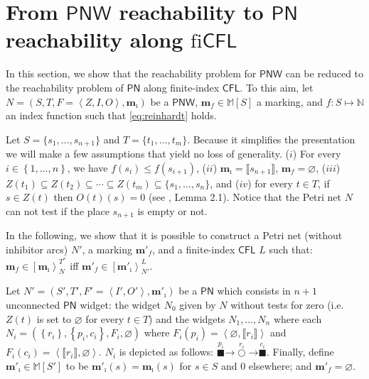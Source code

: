 \documentclass{fsttcs}
\def\set#1{{\left\{ #1 \right\}}}
\def\tuple#1{{\left\langle #1 \right\rangle}}
\def\multi#1{{\llbracket #1 \rrbracket}}
\def\nats{{\mathbb{N}}}
\newcommand{\multiset}[1]{{\mathbb{M}[ #1 ]}}
\def\mmap{\mathbf{m}}
\newcommand{\fire}[1]{\left[ {#1}\right\rangle}
\def\cfl{\mathsf{CFL}}
\def\pn{\mathsf{PN}}
\def\pnw{\mathsf{PNW}}
\begin{document}
 \section{From $\pnw$ reachability to  $\pn$ reachability along \(\text{fi}\cfl\)}\label{sec:reduc_faouzi}

In this section, we show that the reachability problem for \(\pnw\) can be
reduced to the reachability problem of \(\pn\) along finite-index \(\cfl\). To
this aim, let $N=(S,T,F=\tuple{Z,I,O},\mmap_{\imath})$ be a $\pnw$, $\mmap_f
\in \multiset{S}$ a marking,  and \(f\colon S\mapsto\nats\) an
index function such that \eqref{eq:reinhardt} holds.



Let $S=\{s_1,\ldots,s_{n+1}\}$   and $T=\{t_1,\ldots, t_m\}$.  Because it
simplifies the presentation we will make a few assumptions that yield no loss
of generality.  (\(i\)) For every $i \in \set{1,\ldots,n}$, we have $f(s_i) \leq
f(s_{i+1})$, (\(ii\)) $\mmap_{\imath}=\multi{s_{n+1}}$,   $\mmap_{f}=\varnothing$,
(\(iii\)) $Z(t_1) \subseteq Z(t_2) \subseteq \cdots \subseteq Z(t_m) \subseteq
\{s_1,\ldots,s_n\}$, and (\(iv\)) for every $t \in T$, if $s \in Z(t)$ then
$O(t)(s)=0$ (see \cite{Reinhardt}, Lemma 2.1).  Notice that the Petri net $N$
can not test if the place $s_{n+1}$ is empty or not.



In the following, we show that it is possible to construct a Petri net (without
inhibitor arcs)  $N'$, a marking
\(\mmap'_{f}\), and a finite-index \(\cfl\) $L$ such that:
\(\mmap_{f}\in\fire{\mmap_{\imath}}_{N}^{T^*}\)
if{}f
\(\mmap'_{f}\in\fire{\mmap'_{\imath}}_{N'}^{L}\).


\smallskip {} 
Let \(N'=(S',T',F'=\tuple{I',O'},\mmap'_{\imath})\) be a \(\pn\) which consists
in \(n+1\) unconnected \(\pn\) widget:
the widget \(N_0\) given by \(N\) without tests for zero (i.e. \(Z(t)\) is set to \(\varnothing\) for every \(t\in T\)) and the widgets \(N_1,\ldots,N_n\) where each
\(N_{i}=(\set{r_i},\set{p_i,c_i}, F_i, \varnothing)\) where
\(F_i(p_i)=\tuple{\varnothing,\multi{r_i}}\) and
\(F_i(c_i)=\tuple{\multi{r_i},\varnothing}\). 
{\(N_i\) is depicted as follows:
\(\stackrel{p_i}{\blacksquare}\!\mathord{\rightarrow}\!\mathord{\stackrel{r_i}{\bigcirc}}\mathord{\rightarrow}\stackrel{c_i}{\blacksquare}\).}
Finally, define \(\mmap'_{\imath}\in\multiset{S'}\) to be 
$\mmap'_{\imath}(s)=\mmap_{\imath}(s)$ for $s \in S$ and $0$ elsewhere;
and \(\mmap'_f=\varnothing\).
\end{document}
